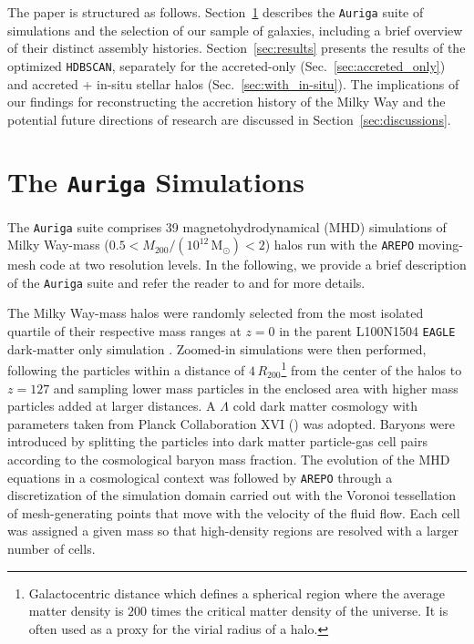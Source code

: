 The paper is structured as follows. Section~\ref{sec:data} describes the \texttt{Auriga} suite of simulations and the selection of our sample of galaxies, including a brief overview of their distinct assembly histories.
Section~\ref{sec:results} presents the results of the optimized \texttt{HDBSCAN}, separately for the accreted-only (Sec.~\ref{sec:accreted_only}) and accreted + in-situ stellar halos (Sec.~\ref{sec:with_in-situ}). The implications of our findings for reconstructing the accretion history of the Milky Way and the potential future directions of research are discussed in Section~\ref{sec:discussions}.


\section{The \texttt{Auriga} Simulations}
\label{sec:data}

The \texttt{Auriga} suite comprises 39 magnetohydrodynamical (MHD) simulations of Milky Way-mass ($0.5<M_{200}/(10^{12} \, \mathrm{M}_{\odot})<2$) halos run with the \texttt{AREPO} \citep{Springel2010} moving-mesh code at two resolution levels. In the following, we provide a brief description of the \texttt{Auriga} suite and refer the reader to \citet{Grand2017} and \citet{Grand2024a} for more details.

The Milky Way-mass halos were randomly selected from the most isolated quartile of their respective mass ranges at $z=0$ in the parent L100N1504 \texttt{EAGLE} dark-matter only simulation \citep{Schaye2015}.  Zoomed-in simulations were then performed, following the particles within a distance of $4\, R_{200}$\footnote{Galactocentric distance which defines a spherical region where the average matter density is $200$ times the critical matter density of the universe. It is often used as a proxy for the virial radius of a halo.} from the center of the halos to $z=127$ and sampling lower mass particles in the enclosed area with higher mass particles added at larger distances. A $\Lambda$ cold dark matter cosmology with parameters taken from Planck Collaboration XVI (\citeyear{PlanckCollaboration2014}) was adopted. Baryons were introduced by splitting the particles into dark matter particle-gas cell pairs according to the cosmological baryon mass fraction. The evolution of the MHD equations in a cosmological context was followed by \texttt{AREPO} through a discretization of the simulation domain carried out with the Voronoi tessellation of mesh-generating points that move with the velocity of the fluid flow. Each cell was assigned a given mass so that high-density regions are resolved with a larger number of cells.

